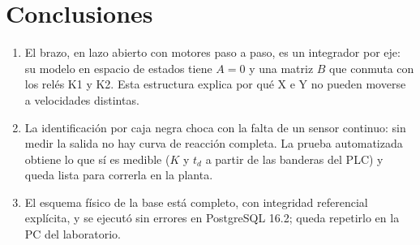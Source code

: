 \documentclass[a4paper,11pt]{article}
\begin{document}
\section{Conclusiones}
\begin{enumerate}
\item El brazo, en lazo abierto con motores paso a paso, es un integrador por eje: su modelo en espacio de estados tiene $A = 0$ y una matriz $B$ que conmuta con los relés K1 y K2. Esta estructura explica por qué X e Y no pueden moverse a velocidades distintas.
\item La identificación por caja negra choca con la falta de un sensor continuo: sin medir la salida no hay curva de reacción completa. La prueba automatizada obtiene lo que sí es medible ($K$ y $t_d$ a partir de las banderas del PLC) y queda lista para correrla en la planta.
\item El esquema físico de la base está completo, con integridad referencial explícita, y se ejecutó sin errores en PostgreSQL 16.2; queda repetirlo en la PC del laboratorio.
\end{enumerate}
\end{document}
